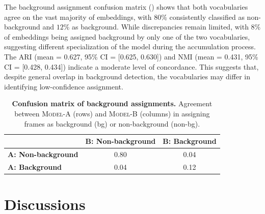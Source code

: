                 The background assignment confusion matrix () shows that both vocabularies agree on the vast majority of embeddings, with $80\%$ consistently classified as non-background and $12\%$ as background. While discrepancies remain limited, with $8\%$ of embeddings being assigned background by only one of the two vocabularies, suggesting different specialization of the model during the accumulation process. The ARI (mean = 0.627, 95\% CI = [0.625, 0.630]) and NMI (mean = 0.431, 95\% CI = [0.428, 0.434]) indicate a moderate level of concordance. This suggests that, despite general overlap in background detection, the vocabularies may differ in identifying low-confidence assignment.

                \begin{table}[!htbp]
                    \centering
                    \caption{\textbf{Confusion matrix of background assignments.} 
                    Agreement between \textsc{Model-A} (rows) and \textsc{Model-B} (columns) in assigning frames as background (bg) or non-background (non-bg).}
                    \label{tab:bg_confusion}
                    \vspace{0.5em}
                    \begin{tabular}{lcc}        
                        \toprule
                        & \textbf{B: Non-background} & \textbf{B: Background} \\
                        \midrule
                        \textbf{A: Non-background} & 0.80 & 0.04 \\
                        \textbf{A: Background}     & 0.04 & 0.12 \\
                        \bottomrule
                    \end{tabular}
                \end{table}

\section{Discussions}
\label{sec:chapter_5_conclusion}

